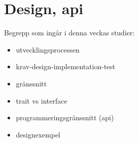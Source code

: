 \chapter{Design, api}\label{chapter:W13}
Begrepp som ingår i denna veckas studier:
\begin{itemize}[noitemsep,label={$\square$},leftmargin=*]
\item utvecklingsprocessen
\item krav-design-implementation-test
\item gränssnitt
\item trait vs interface
\item programmeringsgränssnitt (api)
\item designexempel\end{itemize}
